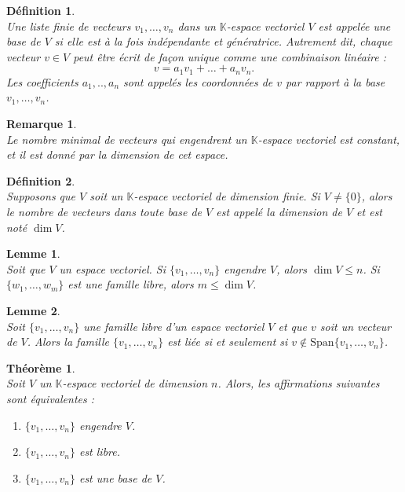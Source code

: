 \documentclass[a4paper, 14pt]{report}
\newtheorem{definition}{Définition}[section]
\newtheorem{remark}{Remarque}[section]
\newtheorem{theorem}{Théorème}[section]
\newtheorem{lemma}{Lemme}
\begin{document}
\begin{onehalfspace}
{\begin{definition} \cite{lang2012algebra} \\
Une liste finie de vecteurs \( v_1, \dots, v_n \) dans un \(\mathbb{K}\)-espace vectoriel \( V \) est appelée une base de \( V \) si elle est à la fois indépendante et génératrice. Autrement dit, chaque vecteur \( v \in V \) peut être écrit de façon unique comme une combinaison linéaire :
	\[
	v = a_1 v_1 + \dots + a_n v_n.
	\]
Les coefficients \(a_1,..,a_n\) sont appelés les coordonnées de \( v \) par rapport à la base \( v_1, \dots, v_n \).
\end{definition}

\begin{remark} \cite{lang2012algebra}\\
Le nombre minimal de vecteurs qui engendrent un \(\mathbb{K}\)-espace vectoriel est constant, et il est donné par la dimension de cet espace.
\end{remark}

\begin{definition} \cite{lang2012algebra} \\
Supposons que \( V \) soit un \(\mathbb{K}\)-espace vectoriel de dimension finie. Si \( V \neq \{0\} \), alors le nombre de vecteurs dans toute base de \( V \) est appelé la dimension de \( V \) et est noté \( \dim V \).
\end{definition}


\begin{lemma} \cite{lang2012algebra} \\
Soit que \( V \) un espace vectoriel. Si \( \{v_1, \dots, v_n\} \) engendre \( V \), alors \( \dim V \leq n \). Si \( \{w_1, \dots, w_m\} \) est une famille libre, alors \( m \leq \dim V \).
\end{lemma}

\begin{lemma} \cite{lang2012algebra} \\
Soit \( \{v_1, \dots, v_n\} \) une famille libre d'un espace vectoriel $V$ et que \( v \) soit un vecteur de $V$. Alors la famille  \( \{ v_1, \dots, v_n\} \) est liée si et seulement si \( v \notin \mathrm{Span}\{v_1, \dots, v_n\} \).
\end{lemma}


\begin{theorem} \cite{lang2012algebra} \\
Soit \( V \) un \(\mathbb{K}\)-espace vectoriel de dimension \( n \). Alors, les affirmations suivantes sont équivalentes :
	\begin{enumerate}[label=(\alph*)]
		\item \( \{v_1, \ldots, v_n\} \) engendre \( V \).
		\item \( \{v_1, \ldots, v_n\} \) est libre.
		\item \( \{v_1, \ldots, v_n\} \) est une base de \( V \).
	\end{enumerate}
\end{theorem}


}
\end{onehalfspace}
\end{document}
